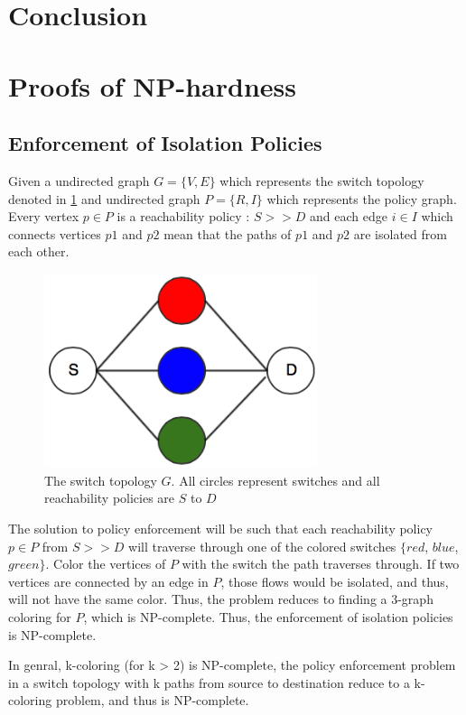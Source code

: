 \documentclass[]{sig}
\begin{document}
\section{Conclusion}
{}

 \appendix
 \section{Proofs of NP-hardness} \label{sec:np}
 \subsection{Enforcement of Isolation Policies}
 Given a undirected graph $G=\{V,E\}$ which represents the switch topology denoted in \cref{fig:swtopo} and undirected graph $P =\{R,I\}$ which represents the policy graph. Every vertex $p \in P$ is a reachability policy : $S >> D$ and each edge $i \in I$ which connects vertices $p1$ and $p2$ mean that the paths of $p1$ and $p2$ are isolated from each other. 
 \begin{figure}[H] 
 	\includegraphics[width=8cm]{color_topo.png}
 	\caption{The switch topology $G$. All circles represent switches and all reachability policies are $S$ to $D$}
 	\label{fig:swtopo}
 \end{figure}
The solution to policy enforcement will be such that each reachability policy $p \in P$ from $S >> D$ will traverse through one of the colored switches $\{red$, $blue$, $green\}$. Color the vertices of $P$ with the switch the path traverses through. If two vertices are connected by an edge in $P$, those flows would be isolated, and thus, will not have the same color. Thus, the problem reduces to finding a 3-graph coloring for $P$, which is NP-complete. Thus, the enforcement of isolation policies is NP-complete. 
 
 In genral, k-coloring (for k > 2) is NP-complete, the policy enforcement problem in a switch topology with k paths from source to destination reduce to a k-coloring problem, and thus is NP-complete. 
 
\end{document}
